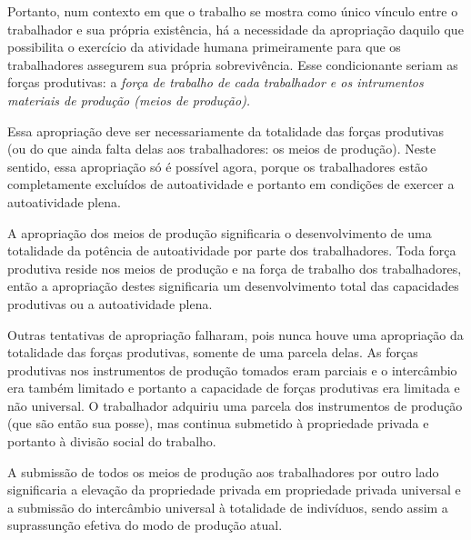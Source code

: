 \documentclass[12pt]{article}
\begin{document}
Portanto, num contexto em que o trabalho se mostra como único vínculo entre o trabalhador e sua própria existência, há a necessidade da apropriação daquilo que possibilita o exercício da atividade humana primeiramente para que os trabalhadores assegurem sua própria sobrevivência.
Esse condicionante seriam as forças produtivas: a \em força de trabalho \em de cada trabalhador e os intrumentos materiais de produção (\em meios de produção\em ).

Essa apropriação deve ser necessariamente da totalidade das forças produtivas (ou do que ainda falta delas aos trabalhadores: os meios de produção).
Neste sentido, essa apropriação só é possível agora, porque os trabalhadores estão completamente excluídos de autoatividade e portanto em condições de exercer a autoatividade plena.

A apropriação dos meios de produção significaria o desenvolvimento de uma totalidade da potência de autoatividade por parte dos trabalhadores.
Toda força produtiva reside nos meios de produção e na força de trabalho dos trabalhadores, então a apropriação destes significaria um desenvolvimento total das capacidades produtivas ou a autoatividade plena.

Outras tentativas de apropriação falharam, pois nunca houve uma apropriação da totalidade das forças produtivas, somente de uma parcela delas.
As forças produtivas nos instrumentos de produção tomados eram parciais e o intercâmbio era também limitado e portanto a capacidade de forças produtivas era limitada e não universal.
O trabalhador adquiriu uma parcela dos instrumentos de produção (que são então sua posse), mas continua submetido à propriedade privada e portanto à divisão social do trabalho.

A submissão de todos os meios de produção aos trabalhadores por outro lado significaria a elevação da propriedade privada em propriedade privada universal e a submissão do intercâmbio universal à totalidade de indivíduos, sendo assim a suprassunção efetiva do modo de produção atual.
\end{document}
